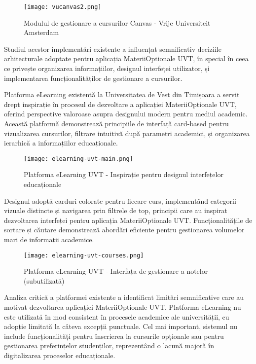 \documentclass[12pt,a4paper]{report}
\begin{document}
\begin{figure}[H]
\centering
\texttt{[image: vucanvas2.png]}
\caption{Modulul de gestionare a cursurilor Canvas - Vrije Universiteit Amsterdam}
\label{fig:canvas2}
\end{figure}

Studiul acestor implementări existente a influențat semnificativ deciziile arhitecturale adoptate pentru aplicația MateriiOptionale UVT, în special în ceea ce privește organizarea informațiilor, designul interfeței utilizator, și implementarea funcționalităților de gestionare a cursurilor.

Platforma eLearning existentă la Universitatea de Vest din Timișoara a servit drept inspirație în procesul de dezvoltare a aplicației MateriiOptionale UVT, oferind perspective valoroase asupra designului modern pentru mediul academic. Această platformă demonstrează principiile de interfață card-based pentru vizualizarea cursurilor, filtrare intuitivă după parametri academici, și organizarea ierarhică a informațiilor educaționale.

\begin{figure}[H]
\centering
\texttt{[image: elearning-uvt-main.png]}
\caption{Platforma eLearning UVT - Inspirație pentru designul interfețelor educaționale}
\label{fig:elearning-main}
\end{figure}

Designul adoptă carduri colorate pentru fiecare curs, implementând categorii vizuale distincte și navigarea prin filtrele de top, principii care au inspirat dezvoltarea interfeței pentru aplicația MateriiOptionale UVT. Funcționalitățile de sortare și căutare demonstrează abordări eficiente pentru gestionarea volumelor mari de informații academice.

\begin{figure}[H]
\centering
\texttt{[image: elearning-uvt-courses.png]}
\caption{Platforma eLearning UVT - Interfața de gestionare a notelor (subutilizată)}
\label{fig:elearning-courses}
\end{figure}

Analiza critică a platformei existente a identificat limitări semnificative care au motivat dezvoltarea aplicației MateriiOptionale UVT. Platforma eLearning nu este utilizată în mod consistent în procesele academice ale universității, cu adopție limitată la câteva excepții punctuale. Cel mai important, sistemul nu include funcționalități pentru înscrierea la cursurile opționale sau pentru gestionarea preferințelor studenților, reprezentând o lacună majoră în digitalizarea proceselor educaționale.
\end{document}
